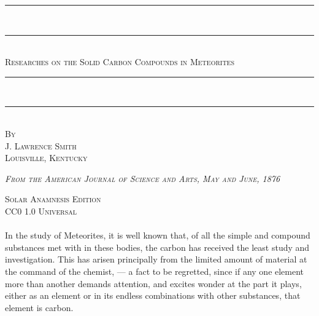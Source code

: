 \documentclass[a4paper, 11pt, oneside, english]{article}
\begin{document}
\begin{titlepage}
    \centering                     %

    \rule{\textwidth}{1.6pt}\\[-\baselineskip]\vskip2pt
    \rule{\textwidth}{0.4pt}\\[1\baselineskip]

    {\scshape\Huge Researches on the Solid Carbon Compounds in Meteorites}\\[1\baselineskip]

    \rule{\textwidth}{0.4pt}\\[-\baselineskip]\vskip3.2pt
    \rule{\textwidth}{1.6pt}\\[1\baselineskip]

    
    {\scshape By \\\Large J. Lawrence Smith\\\small Louisville, Kentucky}\\[1\baselineskip]

    

    \vfill

    {\scshape \emph{From the American Journal of Science and Arts, May and June, 1876}}

    {\scshape Solar Anamnesis Edition}\\[0.2\baselineskip]
    {\scshape\small CC0 1.0 Universal}
\end{titlepage}
\setlength{\parskip}{1mm plus1mm minus1mm}
\clearpage
\paragraph{}
In the study of Meteorites, it is well known that, of all the simple and compound substances met with in these bodies, the carbon has received the least study and investigation. This has arisen principally from the limited amount of material at the command of the chemist, --- a fact to be regretted, since if any one element more than another demands attention, and excites wonder at the part it plays, either as an element or in its endless combinations with other substances, that element is carbon.
\end{document}
